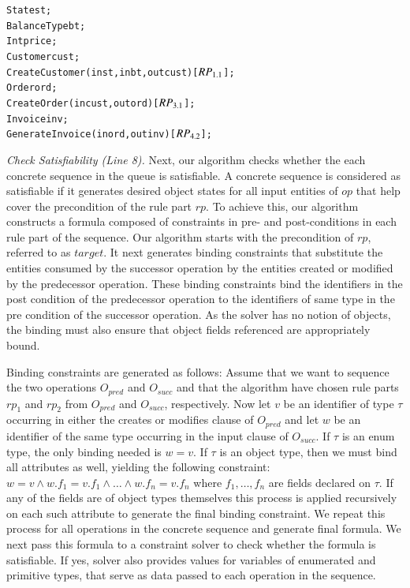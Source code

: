 \vspace*{-5pt}
{\small
\begin{alltt}
  State st;
  BalanceType bt;
  Int price;
  Customer cust;
  CreateCustomer(in st,in bt, out cust) [\(RP\sb{1.1}\)];
  Order ord;
  CreateOrder(in cust, out ord) [\(RP\sb{3.1}\)];	
  Invoice inv;
  GenerateInvoice(in ord, out inv) [\(RP\sb{4.2}\)];  
\end{alltt}
}
\vspace*{-5pt}

\textit{Check Satisfiability (Line 8).} Next, our algorithm checks whether the 
each concrete sequence in the queue is satisfiable. A concrete sequence 
is considered as satisfiable if it generates desired
object states for all input entities of $op$ that help cover the precondition of the rule
part $rp$. To achieve this, our algorithm constructs a formula composed
of constraints in pre- and post-conditions in each rule part of the sequence. Our algorithm
starts with the precondition of $rp$, referred to as $target$. It next generates
binding constraints that substitute the entities
consumed by the successor operation by the entities created or
modified by the predecessor operation. These binding constraints bind 
the identifiers in the post condition of the predecessor operation to the identifiers of same type
in the pre condition of the successor operation. As the solver has no
notion of objects, the binding must also ensure that object fields
referenced are appropriately bound.

Binding constraints are generated as follows: Assume that we want to
sequence the two operations $O_{pred}$ and $O_{succ}$ and that the
algorithm have chosen rule parts $rp_1$ and $rp_2$ from $O_{pred}$ and
$O_{succ}$, respectively. Now let $v$ be an
identifier of type $\tau$ occurring in either the creates or modifies
clause of $O_{pred}$ and let $w$ be an identifier of the same type
occurring in the input clause of $O_{succ}$. If $\tau$ is an enum type,
the only binding needed is $w = v$. If $\tau$ is an object type, then
we must bind all attributes as well, yielding the following constraint:
$w = v \wedge w.f_1 = v.f_1 \wedge \ldots \wedge w.f_n = v.f_n$ where
$f_1, \ldots , f_n$ are fields declared on $\tau$. If any of the
fields are of object types themselves this process is applied
recursively on each such attribute to generate the final binding
constraint. We repeat this process for all operations in the concrete sequence
and generate final formula. We next pass this formula to a constraint solver to check
whether the formula is satisfiable. If yes, solver also provides values for variables
of enumerated and primitive types, that serve as data passed to each operation
in the sequence.

